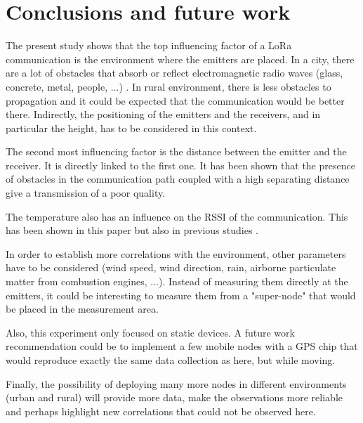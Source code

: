 \documentclass[letterpaper, 10 pt, conference]{ieeeconf}  %
\begin{document}
\section{Conclusions and future work}




The present study shows that the top influencing factor of a LoRa communication is the environment where the emitters are placed. In a city, there are a lot of obstacles that absorb or reflect electromagnetic radio waves (glass, concrete, metal, people, ...) \cite{c16}. In rural environment, there is less obstacles to propagation and it could be expected that the communication would be better there. Indirectly, the positioning of the emitters and the receivers, and in particular the height, has to be considered in this context.

The second most influencing factor is the distance between the emitter and the receiver. It is directly linked to the first one. It has been shown that the presence of obstacles in the communication path coupled with a high separating distance give a transmission of a poor quality.

The temperature also has an influence on the RSSI of the communication. This has been shown in this paper but also in previous studies \cite{c12}\cite{c14}\cite{c15}.

In order to establish more correlations with the environment, other parameters have to be considered (wind speed, wind direction, rain, airborne particulate matter from combustion engines, ...). Instead of measuring them directly at the emitters, it could be interesting to measure them from a "super-node" that would be placed in the measurement area.

Also, this experiment only focused on static devices. A future work recommendation could be to implement a few mobile nodes with a GPS chip that would reproduce exactly the same data collection as here, but while moving.

Finally, the possibility of deploying many more nodes in different environments (urban and rural) will provide more data, make the observations more reliable and perhaps highlight new correlations that could not be observed here.
\end{document}
